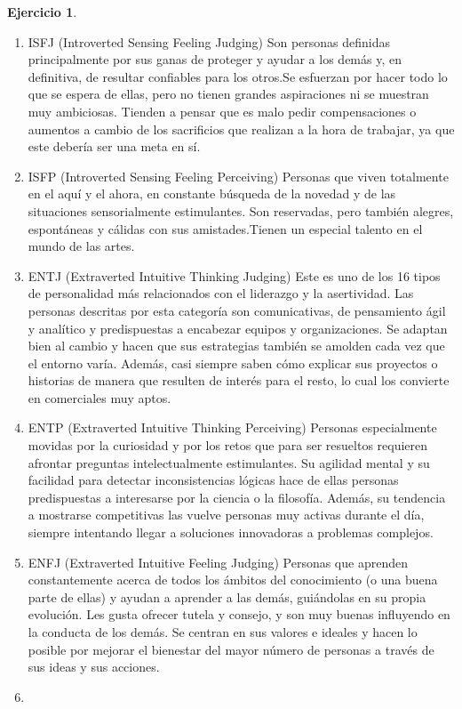 \documentclass[
  10pt,
]{krantz}
\theoremstyle{definition}
\theoremstyle{definition}
\theoremstyle{definition}
\newtheorem{exercise}{Ejercicio}[chapter]
\theoremstyle{definition}
\theoremstyle{remark}
\begin{document}
\begin{exercise}
\begin{enumerate}
\item
  ISFJ (Introverted Sensing Feeling Judging)
  Son personas definidas principalmente por sus ganas de proteger y ayudar a los demás y, en definitiva, de resultar confiables para los otros.Se esfuerzan por hacer todo lo que se espera de ellas, pero no tienen grandes aspiraciones ni se muestran muy ambiciosas. Tienden a pensar que es malo pedir compensaciones o aumentos a cambio de los sacrificios que realizan a la hora de trabajar, ya que este debería ser una meta en sí.
\item
  ISFP (Introverted Sensing Feeling Perceiving)
  Personas que viven totalmente en el aquí y el ahora, en constante búsqueda de la novedad y de las situaciones sensorialmente estimulantes. Son reservadas, pero también alegres, espontáneas y cálidas con sus amistades.Tienen un especial talento en el mundo de las artes.
\item
  ENTJ (Extraverted Intuitive Thinking Judging)
  Este es uno de los 16 tipos de personalidad más relacionados con el liderazgo y la asertividad. Las personas descritas por esta categoría son comunicativas, de pensamiento ágil y analítico y predispuestas a encabezar equipos y organizaciones. Se adaptan bien al cambio y hacen que sus estrategias también se amolden cada vez que el entorno varía. Además, casi siempre saben cómo explicar sus proyectos o historias de manera que resulten de interés para el resto, lo cual los convierte en comerciales muy aptos.
\item
  ENTP (Extraverted Intuitive Thinking Perceiving)
  Personas especialmente movidas por la curiosidad y por los retos que para ser resueltos requieren afrontar preguntas intelectualmente estimulantes. Su agilidad mental y su facilidad para detectar inconsistencias lógicas hace de ellas personas predispuestas a interesarse por la ciencia o la filosofía. Además, su tendencia a mostrarse competitivas las vuelve personas muy activas durante el día, siempre intentando llegar a soluciones innovadoras a problemas complejos.
\item
  ENFJ (Extraverted Intuitive Feeling Judging)
  Personas que aprenden constantemente acerca de todos los ámbitos del conocimiento (o una buena parte de ellas) y ayudan a aprender a las demás, guiándolas en su propia evolución. Les gusta ofrecer tutela y consejo, y son muy buenas influyendo en la conducta de los demás. Se centran en sus valores e ideales y hacen lo posible por mejorar el bienestar del mayor número de personas a través de sus ideas y sus acciones.
\item

\end{enumerate}
\end{exercise}
\end{document}
